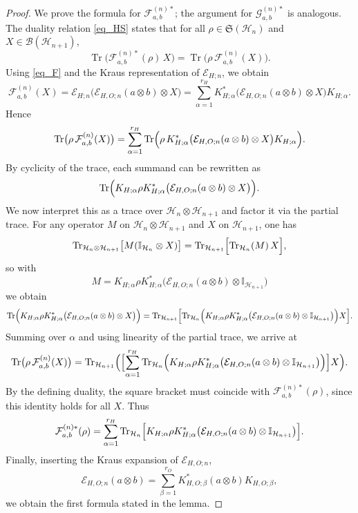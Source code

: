 \documentclass[10pt,a4paper]{amsart}
\begin{document}
\begin{proof}
We prove the formula for $\mathcal{F}_{a,b}^{(n)*}$; the argument for $\mathcal{G}_{a,b}^{(n)*}$ is analogous. The duality relation \eqref{eq_HS} states that for all $\rho\in\mathfrak{S}(\mathcal{H}_n)$ and $X\in\mathcal{B}(\mathcal{H}_{n+1})$,
\[
\operatorname{Tr}\bigl(\mathcal{F}_{a,b}^{(n)*}(\rho)\,X\bigr)
=
\operatorname{Tr}\bigl(\rho\,\mathcal{F}_{a,b}^{(n)}(X)\bigr).
\]
Using \eqref{eq_F} and the Kraus representation of $\mathcal{E}_{H;n}$, we obtain
\[
\mathcal{F}_{a,b}^{(n)}(X)
=
\mathcal{E}_{H;n}\bigl(\mathcal{E}_{H,O;n}(a\otimes b)\otimes X\bigr)
=
\sum_{\alpha=1}^{r_H}
K_{H;\alpha}^{*}\bigl(\mathcal{E}_{H,O;n}(a\otimes b)\otimes X\bigr)K_{H;\alpha}.
\]
Hence
\[
\operatorname{Tr}\bigl(\rho\,\mathcal{F}_{a,b}^{(n)}(X)\bigr)
=
\sum_{\alpha=1}^{r_H}
\operatorname{Tr}\Bigl(\rho\,K_{H;\alpha}^{*}\bigl(\mathcal{E}_{H,O;n}(a\otimes b)\otimes X\bigr)K_{H;\alpha}\Bigr).
\]
By cyclicity of the trace, each summand can be rewritten as
\[
\operatorname{Tr}\Bigl(K_{H;\alpha}\rho K_{H;\alpha}^{*}\bigl(\mathcal{E}_{H,O;n}(a\otimes b)\otimes X\bigr)\Bigr).
\]
We now interpret this as a trace over $\mathcal{H}_n\otimes\mathcal{H}_{n+1}$ and factor it via the partial trace. For any operator $M$ on $\mathcal{H}_n\otimes\mathcal{H}_{n+1}$ and $X$ on $\mathcal{H}_{n+1}$, one has
\[
\operatorname{Tr}_{\mathcal{H}_n\otimes\mathcal{H}_{n+1}}\bigl[M(\mathbb{I}_{\mathcal{H}_n}\otimes X)\bigr]
=
\operatorname{Tr}_{\mathcal{H}_{n+1}}\Bigl[\operatorname{Tr}_{\mathcal{H}_n}(M)\,X\Bigr],
\]
so with
\[
M
=
K_{H;\alpha}\rho K_{H;\alpha}^{*}
\bigl(\mathcal{E}_{H,O;n}(a\otimes b)\otimes\mathbb{I}_{\mathcal{H}_{n+1}}\bigr)
\]
we obtain
\[
\operatorname{Tr}\Bigl(K_{H;\alpha}\rho K_{H;\alpha}^{*}\bigl(\mathcal{E}_{H,O;n}(a\otimes b)\otimes X\bigr)\Bigr)
=
\operatorname{Tr}_{\mathcal{H}_{n+1}}\Bigl[
\operatorname{Tr}_{\mathcal{H}_n}\Bigl(
K_{H;\alpha}\rho K_{H;\alpha}^{*}
\bigl(\mathcal{E}_{H,O;n}(a\otimes b)\otimes\mathbb{I}_{\mathcal{H}_{n+1}}\bigr)
\Bigr)X
\Bigr].
\]
Summing over $\alpha$ and using linearity of the partial trace, we arrive at
\[
\operatorname{Tr}\bigl(\rho\,\mathcal{F}_{a,b}^{(n)}(X)\bigr)
=
\operatorname{Tr}_{\mathcal{H}_{n+1}}\Bigl(
\Bigl[
\sum_{\alpha=1}^{r_H}
\operatorname{Tr}_{\mathcal{H}_n}\Bigl(
K_{H;\alpha}\rho K_{H;\alpha}^{*}
\bigl(\mathcal{E}_{H,O;n}(a\otimes b)\otimes\mathbb{I}_{\mathcal{H}_{n+1}}\bigr)
\Bigr)
\Bigr]X
\Bigr).
\]
By the defining duality, the square bracket must coincide with $\mathcal{F}_{a,b}^{(n)*}(\rho)$, since this identity holds for all $X$. Thus
\[
\mathcal{F}_{a,b}^{(n)*}(\rho)
=
\sum_{\alpha=1}^{r_H}
\operatorname{Tr}_{\mathcal{H}_n}\Bigl[
K_{H;\alpha}\rho K_{H;\alpha}^{*}
\bigl(\mathcal{E}_{H,O;n}(a\otimes b)\otimes\mathbb{I}_{\mathcal{H}_{n+1}}\bigr)
\Bigr].
\]
Finally, inserting the Kraus expansion of $\mathcal{E}_{H,O;n}$,
\[
\mathcal{E}_{H,O;n}(a\otimes b)
=
\sum_{\beta=1}^{r_O}K_{H,O;\beta}^{*}(a\otimes b)K_{H,O;\beta},
\]
we obtain the first formula stated in the lemma.


\end{proof}
\end{document}
